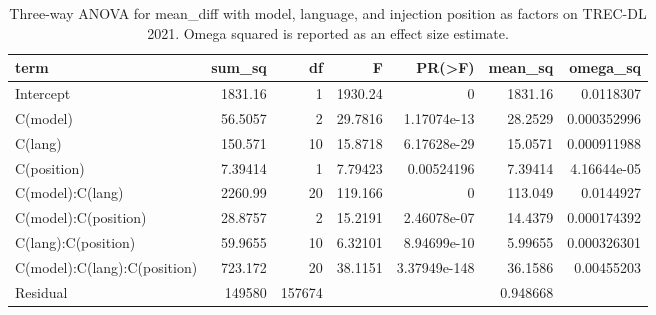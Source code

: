 \begin{table}
\caption{Three-way ANOVA for mean_diff with model, language, and injection position as factors on TREC-DL 2021. Omega squared is reported as an effect size estimate.}
\label{tab:anova_model_language_position_mean_diff_2021}
\begin{tabular}{l r r r r r r}
\toprule
term & sum_sq & df & F & PR(>F) & mean_sq & omega_sq \\
\midrule
Intercept & 1831.16 & 1 & 1930.24 & 0 & 1831.16 & 0.0118307 \\
C(model) & 56.5057 & 2 & 29.7816 & 1.17074e-13 & 28.2529 & 0.000352996 \\
C(lang) & 150.571 & 10 & 15.8718 & 6.17628e-29 & 15.0571 & 0.000911988 \\
C(position) & 7.39414 & 1 & 7.79423 & 0.00524196 & 7.39414 & 4.16644e-05 \\
C(model):C(lang) & 2260.99 & 20 & 119.166 & 0 & 113.049 & 0.0144927 \\
C(model):C(position) & 28.8757 & 2 & 15.2191 & 2.46078e-07 & 14.4379 & 0.000174392 \\
C(lang):C(position) & 59.9655 & 10 & 6.32101 & 8.94699e-10 & 5.99655 & 0.000326301 \\
C(model):C(lang):C(position) & 723.172 & 20 & 38.1151 & 3.37949e-148 & 36.1586 & 0.00455203 \\
Residual & 149580 & 157674 &  &  & 0.948668 &  \\
\bottomrule
\end{tabular}
\end{table}
